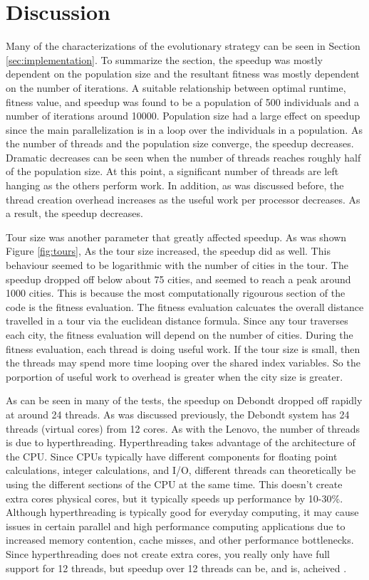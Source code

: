 \documentclass[10pt,letterpaper]{article}
\begin{document}
\section{Discussion} \label{sec:discussion}
Many of the characterizations of the evolutionary strategy can be seen in Section \ref{sec:implementation}. To summarize the section, the speedup was mostly dependent on the population size and the resultant fitness was mostly dependent on the number of iterations. A suitable relationship between optimal runtime, fitness value, and speedup was found to be a population of 500 individuals and a number of iterations around 10000. Population size had a large effect on speedup since the main parallelization is in a loop over the individuals in a population. As the number of threads and the population size converge, the speedup decreases. Dramatic decreases can be seen when the number of threads reaches roughly half of the population size. At this point, a significant number of threads are left hanging as the others perform work. In addition, as was discussed before, the thread creation overhead increases as the useful work per processor decreases. As a result, the speedup decreases.

Tour size was another parameter that greatly affected speedup. As was shown Figure \ref{fig:tours}, As the tour size increased, the speedup did as well. %
This behaviour seemed to be logarithmic with the number of cities in the tour. The speedup dropped off below about 75 cities, and seemed to reach a peak around 1000 cities. This is because the most computationally rigourous section of the code is the fitness evaluation. The fitness evaluation calcuates the overall distance travelled in a tour via the euclidean distance formula. Since any tour traverses each city, the fitness evaluation will depend on the number of cities. During the fitness evaluation, each thread is doing useful work. If the tour size is small, then the threads may spend more time looping over the shared index variables. So the porportion of useful work to overhead is greater when the city size is greater.

As can be seen in many of the tests, the speedup on Debondt dropped off rapidly at around 24 threads. As was discussed previously, the Debondt system has 24 threads (virtual cores) from 12 cores. As with the Lenovo, the number of threads is due to hyperthreading. Hyperthreading takes advantage of the architecture of the CPU. Since CPUs typically have different components for floating point calculations, integer calculations, and I/O, different threads can theoretically be using the different sections of the CPU at the same time. This doesn't create extra cores physical cores, but it typically speeds up performance by 10-30\%. Although hyperthreading is typically good for everyday computing, it may cause issues in certain parallel and high performance computing applications due to increased memory contention, cache misses, and other performance bottlenecks. Since hyperthreading does not create extra cores, you really only have full support for 12 threads, but speedup over 12 threads can be, and is, acheived \cite{leng2002study}. 
\end{document}
